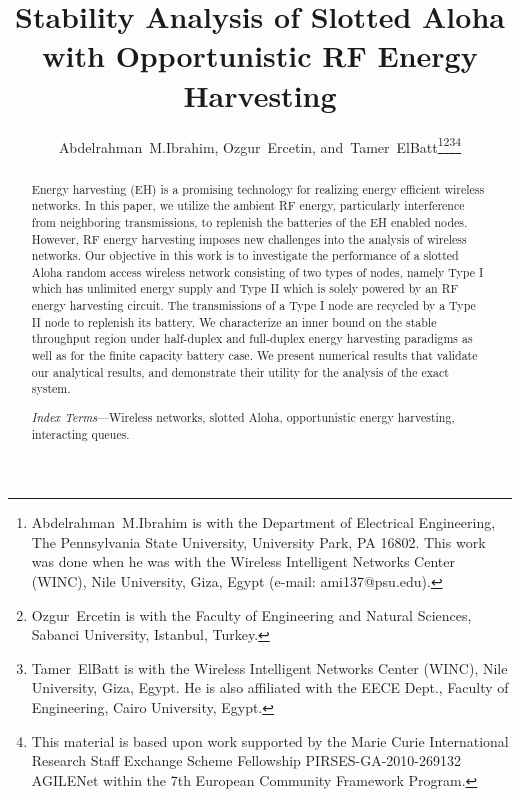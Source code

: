 \documentclass[draftcls,12pt,onecolumn]{IEEEtran}
\begin{document}
\title{Stability Analysis of Slotted Aloha with Opportunistic RF Energy Harvesting}





\author{Abdelrahman~M.Ibrahim, Ozgur~Ercetin, and~Tamer~ElBatt\thanks{Abdelrahman~M.Ibrahim is with the Department of Electrical Engineering, The Pennsylvania State University, University Park, PA 16802. This work was done when he was with the Wireless Intelligent Networks Center (WINC), Nile University, Giza, Egypt (e-mail: ami137@psu.edu).}\thanks{Ozgur~Ercetin is with the Faculty of Engineering and Natural Sciences, Sabanci University, Istanbul, Turkey.}\thanks{Tamer~ElBatt is with the Wireless Intelligent Networks Center (WINC), Nile University, Giza, Egypt. He is also affiliated with the EECE Dept., Faculty of Engineering, Cairo University, Egypt.}\thanks{This material is based upon work supported by the Marie Curie International Research Staff Exchange Scheme Fellowship PIRSES-GA-2010-269132 AGILENet within the 7th European Community Framework Program.}
}
\maketitle

\begin{abstract}
 Energy harvesting (EH) is a promising technology for realizing energy efficient wireless networks. In this paper, we utilize the ambient RF energy, particularly interference from neighboring transmissions, to replenish the batteries of the EH enabled nodes. However, RF energy harvesting imposes new challenges into the analysis of wireless networks. Our objective in this work is to investigate the performance of a slotted Aloha random access wireless network consisting of two types of nodes, namely Type I which has unlimited energy supply and Type II which is solely powered by an RF energy harvesting circuit. The transmissions of a Type I node are recycled by a Type II node to replenish its battery. We characterize an inner bound on the stable throughput region under half-duplex and full-duplex energy harvesting paradigms as well as for the finite capacity battery case. We present numerical results that validate our analytical results, and demonstrate their utility for the analysis of the exact system. 






\textit{Index Terms}---Wireless networks, slotted Aloha, opportunistic energy harvesting, interacting queues.

\end{abstract}
\end{document}
